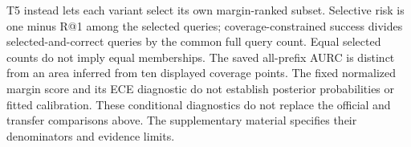 T5 instead lets each variant select its own margin-ranked subset. Selective
risk is one minus R@1 among the selected queries; coverage-constrained
success divides selected-and-correct queries by the common full query count.
Equal selected counts do not imply equal memberships. The saved all-prefix
AURC is distinct from an area inferred from ten displayed coverage points.
The fixed normalized margin score and its ECE diagnostic do not establish
posterior probabilities or fitted calibration. These conditional diagnostics
do not replace the official and transfer comparisons above. The
supplementary material specifies their denominators and evidence limits.
